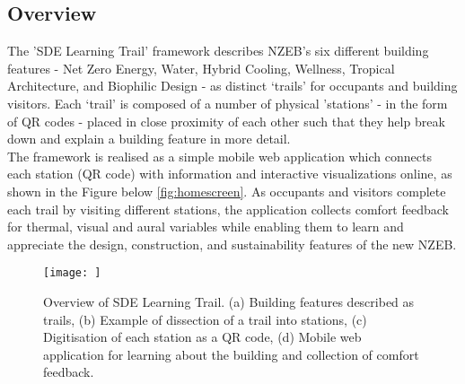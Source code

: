 

\subsection{Overview}

The 'SDE Learning Trail' framework describes NZEB's six different building features - Net Zero Energy, Water, Hybrid Cooling, Wellness, Tropical Architecture, and Biophilic Design - as distinct ‘trails’ for occupants and building visitors. Each ‘trail’ is composed of a number of physical 'stations' - in the form of QR codes - placed in close proximity of each other such that they help break down and explain a building feature in more detail.\\

The framework is realised as a simple mobile web application which connects each station (QR code) with information and interactive visualizations online, as shown in the Figure below \ref{fig:homescreen}. As occupants and visitors complete each trail by visiting different stations, the application collects comfort feedback for thermal, visual and aural variables while enabling them to learn and appreciate the design, construction, and sustainability features of the new NZEB.\\

\begin{figure}
\begin{center}
\texttt{[image: ]}
\caption{Overview of SDE Learning Trail. (a) Building features described as trails, (b) Example of dissection of a trail into stations, (c) Digitisation of each station as a QR code, (d) Mobile web application for learning about the building and collection of comfort feedback.}
\label{fig:framework}
\end{center}
\end{figure}



